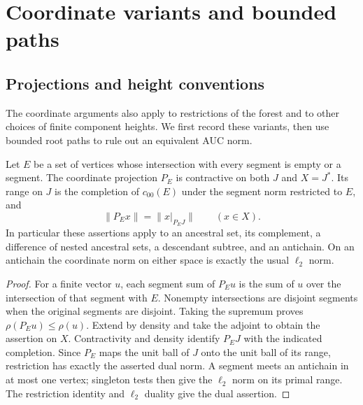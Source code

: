 \section{Coordinate variants and bounded paths}\label{sec:coordinate-variants}
\subsection{Projections and height conventions}

The coordinate arguments also apply to restrictions of the forest and
to other choices of finite component heights. We first record these
variants, then use bounded root paths to rule out an equivalent AUC norm.

\begin{lemma}\label{foundation:order-convex}
Let $E$ be a set of vertices whose intersection with every segment is
empty or a segment. The coordinate projection $P_E$ is contractive on
both $J$ and $X=J^*$. Its range on $J$ is the completion of $c_{00}(E)$
under the segment norm restricted to $E$, and
\[
 \|P_Ex\|=\|x|_{P_EJ}\| \qquad (x\in X).
\]
In particular these assertions apply to an ancestral set, its
complement, a difference of nested ancestral sets, a descendant subtree,
and an antichain. On an antichain the coordinate norm on either space
is exactly the usual $\ell_2$ norm.
\end{lemma}
\begin{proof}
For a finite vector $u$, each segment sum of $P_Eu$ is the sum of $u$
over the intersection of that segment with $E$. Nonempty intersections
are disjoint segments when the original segments are disjoint. Taking
the supremum proves $\rho(P_Eu)\le\rho(u)$. Extend by density and take
the adjoint to obtain the assertion on $X$. Contractivity and density
identify $P_EJ$ with the indicated completion. Since $P_E$ maps the
unit ball of $J$ onto the unit ball of its range, restriction has exactly
the asserted dual norm. A segment meets an antichain in at most one
vertex; singleton tests then give the $\ell_2$ norm on its primal range.
The restriction identity and $\ell_2$ duality give the dual assertion.
\end{proof}

